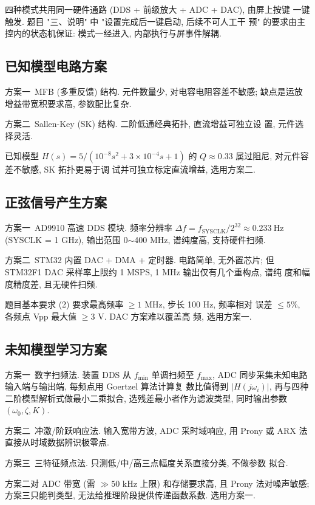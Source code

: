 \documentclass[a4paper]{article}
\begin{document}
四种模式共用同一硬件通路 (DDS + 前级放大 + ADC + DAC), 由屏上按键
一键触发. 题目 "三、说明" 中 "设置完成后一键启动, 后续不可人工干
预" 的要求由主控内的状态机保证: 模式一经进入, 内部执行与屏事件解耦.


\subsection{已知模型电路方案}

方案一\ MFB (多重反馈) 结构. 元件数量少, 对电容电阻容差不敏感;
缺点是运放增益带宽积要求高, 参数配比复杂.

方案二\ Sallen-Key (SK) 结构. 二阶低通经典拓扑, 直流增益可独立设
置, 元件选择灵活.

已知模型 $H(s) = 5/(10^{-8}s^{2} + 3\!\times\!10^{-4}s + 1)$
的 $Q \approx 0.33$ 属过阻尼, 对元件容差不敏感, SK 拓扑更易于调
试并可独立标定直流增益, 选用方案二.


\subsection{正弦信号产生方案}

方案一\ AD9910 高速 DDS 模块. 频率分辨率
$\Delta f = f_{\mathrm{SYSCLK}}/2^{32} \approx 0.233\ \mathrm{Hz}$
(SYSCLK = 1 GHz), 输出范围 0$\sim$400 MHz, 谱纯度高, 支持硬件扫频.

方案二\ STM32 内置 DAC + DMA + 定时器. 电路简单, 无外置芯片; 但
STM32F1 DAC 采样率上限约 1 MSPS, 1 MHz 输出仅有几个重构点, 谱纯
度和幅度精度差, 且无硬件扫频.

题目基本要求 (2) 要求最高频率 $\ge 1$ MHz, 步长 100 Hz, 频率相对
误差 $\le 5$\%, 各频点 Vpp 最大值 $\ge 3$ V. DAC 方案难以覆盖高
频, 选用方案一.


\subsection{未知模型学习方案}

方案一\ 数字扫频法. 装置 DDS 从 $f_{\min}$ 单调扫频至 $f_{\max}$,
ADC 同步采集未知电路输入端与输出端, 每频点用 Goertzel 算法计算复
数比值得到 $|H(j\omega_i)|$, 再与四种二阶模型解析式做最小二乘拟合,
选残差最小者作为滤波类型, 同时输出参数 $(\omega_{0}, \zeta, K)$.

方案二\ 冲激/阶跃响应法. 输入宽带方波, ADC 采时域响应, 用 Prony
或 ARX 法直接从时域数据辨识极零点.

方案三\ 三特征频点法. 只测低/中/高三点幅度关系直接分类, 不做参数
拟合.

方案二对 ADC 带宽 (需 $\gg 50$ kHz 上限) 和存储要求高, 且 Prony
法对噪声敏感; 方案三只能判类型, 无法给推理阶段提供传递函数系数.
选用方案一.
\end{document}
